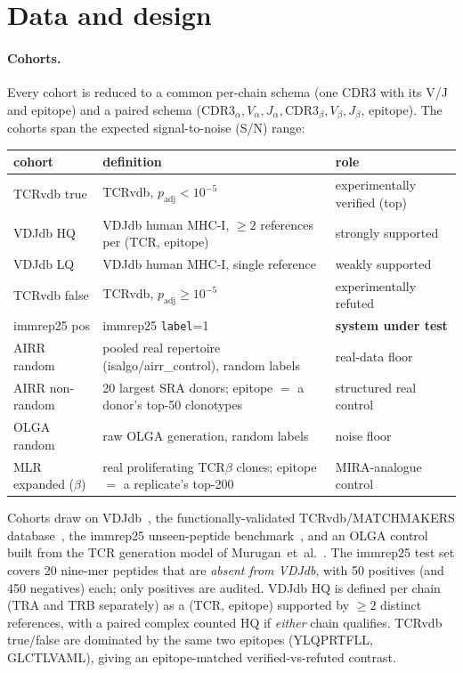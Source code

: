 \section{Data and design}\label{sec:data}

\paragraph{Cohorts.} Every cohort is reduced to a common per-chain schema
(one CDR3 with its V/J and epitope) and a paired schema
($\mathrm{CDR3}_\alpha,V_\alpha,J_\alpha,\mathrm{CDR3}_\beta,V_\beta,J_\beta$, epitope).
The cohorts span the expected signal-to-noise (S/N) range:

\begin{center}\small
\begin{tabular}{@{}lll@{}}
\toprule
cohort & definition & role \\
\midrule
TCRvdb true  & TCRvdb, $p_{\text{adj}}<10^{-5}$ & experimentally verified (top) \\
VDJdb HQ     & VDJdb human MHC-I, $\ge 2$ references per (TCR, epitope) & strongly supported \\
VDJdb LQ     & VDJdb human MHC-I, single reference & weakly supported \\
TCRvdb false & TCRvdb, $p_{\text{adj}}\ge 10^{-5}$ & experimentally refuted \\
immrep25 pos & immrep25 \texttt{label}=1 & \textbf{system under test} \\
AIRR random & pooled real repertoire (isalgo/airr\_control), random labels & real-data floor \\
AIRR non-random & 20 largest SRA donors; epitope $=$ a donor's top-50 clonotypes & structured real control \\
OLGA random  & raw OLGA generation, random labels & noise floor \\
MLR expanded ($\beta$) & real proliferating TCR$\beta$ clones; epitope $=$ a replicate's top-200 & MIRA-analogue control \\
\bottomrule
\end{tabular}
\end{center}

\noindent Cohorts draw on VDJdb~\cite{Shugay_2017}, the functionally-validated
TCRvdb/MATCHMAKERS database~\cite{Messemaker_2025}, the immrep25 unseen-peptide
benchmark~\cite{Richardson2026}, and an OLGA control built from the TCR generation
model of Murugan~et~al.~\cite{Murugan_2012}. The immrep25 test set covers 20
nine-mer peptides that are \emph{absent from VDJdb}, with 50 positives (and 450
negatives) each; only positives are audited.
VDJdb HQ is defined per chain (TRA and TRB separately) as a (TCR, epitope) supported
by $\ge 2$ distinct references, with a paired complex counted HQ if \emph{either}
chain qualifies. TCRvdb true/false are dominated by the same two epitopes
(YLQPRTFLL, GLCTLVAML), giving an epitope-matched verified-vs-refuted contrast.

